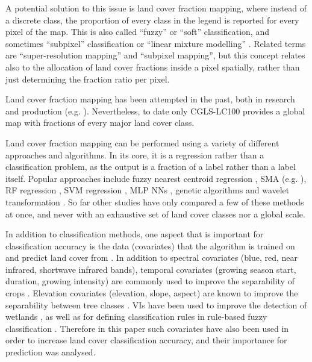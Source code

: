 \documentclass[a4paper,10pt]{article}
\begin{document}
A potential solution to this issue is land cover fraction mapping, where instead of a discrete class, the proportion of every class in the legend is reported for every pixel of the map.
This is also called ``fuzzy'' or ``soft'' classification, and sometimes ``subpixel'' classification or ``linear mixture modelling'' \citep{Okeke2006fuzzyexponent}.
Related terms are ``super-resolution mapping'' and ``subpixel mapping'', but this concept relates also to the allocation of land cover fractions inside a pixel spatially, rather than just determining the fraction ratio per pixel.

Land cover fraction mapping has been attempted in the past, both in research \citep{adams_classification_1995, foody1996fuzzyevaluation, colditz_land_2011, sharma_assessing_2011, uma_shankar_wavelet-fuzzy_2011, dwivedi_optimisation_2012, lizarazo_quantitative_2012, gessner_estimating_2013, okujeni_generalizing_2018} and production (e.g. \citealp{hansen2000hardtree, hansen_continuous_2011, pengra_global_2015, hansen_global_2003, sexton_global_2013}).
Nevertheless, to date only \ac{CGLS-LC100} provides a global map with fractions of every major land cover class.

Land cover fraction mapping can be performed using a variety of different approaches and algorithms.
In its core, it is a regression rather than a classification problem, as the output is a fraction of a label rather than a label itself.
Popular approaches include fuzzy nearest centroid regression \citep{zhang2001fullyfuzzy}, \ac{SMA} (e.g. \citealp{yang_landsat_2012, hobbs2003linear, shimabukuro1991least}), \ac{RF} regression \citep{schwieder_estimating_2014}, \gls{SVM} regression \citep{schwieder_estimating_2014}, \gls{MLP} \glspl{NN} \citep{zhang2001fullyfuzzy}, genetic algorithms \citep{stavrakoudis_boosted_2011} and wavelet transformation \citep{uma_shankar_wavelet-fuzzy_2011}.
So far other studies have only compared a few of these methods at once, and never with an exhaustive set of land cover classes nor a global scale.

In addition to classification methods, one aspect that is important for classification accuracy is the data (covariates) that the algorithm is trained on and predict land cover from \citep{yu2014metadiscoveries}. In addition to spectral covariates (blue, red, near infrared, shortwave infrared bands), temporal covariates (growing season start, duration, growing intensity) are commonly used to improve the separability of crops \citep{jakubauskas2001harmonic}. Elevation covariates (elevation, slope, aspect) are known to improve the separability between tree classes \citep{burrough2001fuzzy}. \Glspl{VI} have been used to improve the detection of wetlands \citep{sader1995wetlands}, as well as for defining classification rules in rule-based fuzzy classification \citep{baraldi2006rulebased}. Therefore in this paper such covariates have also been used in order to increase land cover classification accuracy, and their importance for prediction was analysed.
\end{document}
